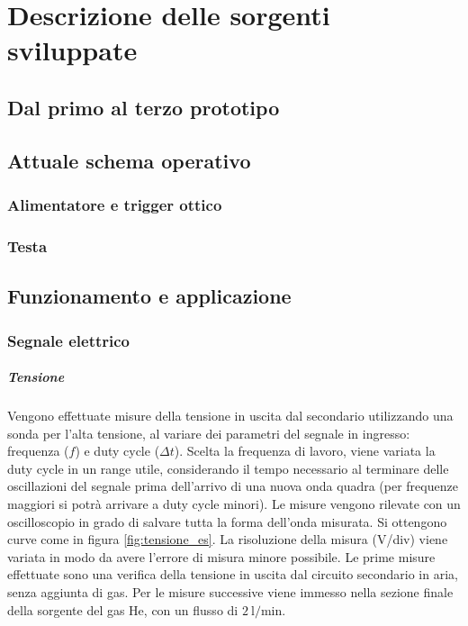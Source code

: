 \chapter{Descrizione delle sorgenti sviluppate}

\section{Dal primo al terzo prototipo}

\section{Attuale schema operativo}
\subsection{Alimentatore e trigger ottico}
\subsection{Testa}

\section{Funzionamento e applicazione}
\subsection{Segnale elettrico}

\paragraph{Tensione}Vengono effettuate misure della tensione in uscita dal secondario utilizzando una sonda per l'alta tensione, al variare dei parametri del segnale in ingresso: frequenza ($f$) e duty cycle ($\Delta t$). Scelta la frequenza di lavoro, viene variata la duty cycle in un range utile, considerando il tempo necessario al terminare delle oscillazioni del segnale prima dell'arrivo di una nuova onda quadra (per frequenze maggiori si potrà arrivare a duty cycle minori).
Le misure vengono rilevate con un oscilloscopio in grado di salvare tutta la forma dell'onda misurata. Si ottengono curve come in figura \ref{fig:tensione_es}. La risoluzione della misura (V/div) viene variata in modo da avere l'errore di misura minore possibile.
Le prime misure effettuate sono una verifica della tensione in uscita dal circuito secondario in aria, senza aggiunta di gas.
Per le misure successive viene immesso nella sezione finale della sorgente del gas He, con un flusso di $\SI{2}{\litre/\minute}$.

